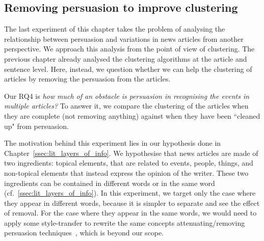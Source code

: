 

\subsection{\statusgreen Removing persuasion to improve clustering}
\label{ssec:lp_relationship_removing}

The last experiment of this chapter takes the problem of analysing the relationship between persuasion and variations in news articles from another perspective.
We approach this analysis from the point of view of clustering.
The previous chapter already analysed the clustering algorithms at the article and sentence level.
Here, instead, we question whether we can help the clustering of articles by removing the persuasion from the articles.

Our RQ4 is \emph{how much of an obstacle is persuasion in recognising the events in multiple articles?} To answer it, we compare the clustering of the articles when they are complete (not removing anything) against when they have been ``cleaned up" from persuasion.

The motivation behind this experiment lies in our hypothesis done in Chapter~\ref{ssec:lit_layers_of_info}. We hypothesise that news articles are made of two ingredients: topical elements, that are related to events, people, things, and non-topical elements that instead express the opinion of the writer. These two ingredients can be contained in different words or in the same word (cf.~\ref{ssec:lit_layers_of_info}). In this experiment, we target only the case where they appear in different words, because it is simpler to separate and see the effect of removal. For the case where they appear in the same words, we would need to apply some style-transfer to rewrite the same concepts attenuating/removing persuasion techniques~\citep{bagdasaryan2022spinning}, which is beyond our scope.


